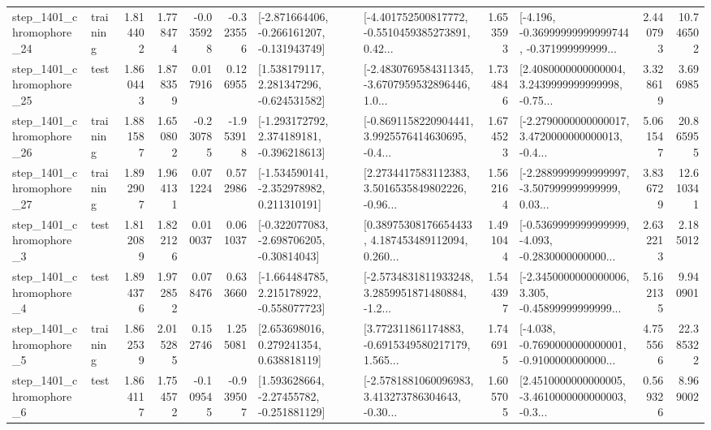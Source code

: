 \begin{tabular}{llrrrrllrlrr}
 step\_1401\_chromophore\_24 &  training &      1.814402 &    1.778474 &     -0.035928 & -0.323556 &  [-2.871664406, -0.266161207, -0.131943749] &  [-4.401752500817772, -0.5510459385273891, 0.42... &       1.653593 &  [-4.196, -0.36999999999999744, -0.371999999999... &            2.440793 &         10.746502 \\
 step\_1401\_chromophore\_25 &      test &      1.860443 &    1.878359 &      0.017916 &  0.126955 &    [1.538179117, 2.281347296, -0.624531582] &  [-2.4830769584311345, -3.6707959532896446, 1.0... &       1.734846 &  [2.4080000000000004, 3.2439999999999998, -0.75... &            3.328619 &          3.696985 \\
 step\_1401\_chromophore\_26 &  training &      1.881587 &    1.650802 &     -0.230785 & -1.953918 &   [-1.293172792, 2.374189181, -0.396218613] &  [-0.8691158220904441, 3.9925576414630695, -0.4... &       1.674523 &  [-2.2790000000000017, 3.4720000000000013, -0.4... &            5.061547 &         20.865955 \\
 step\_1401\_chromophore\_27 &  training &      1.892907 &    1.964131 &      0.071224 &  0.572986 &   [-1.534590141, -2.352978982, 0.211310191] &  [2.2734417583112383, 3.5016535849802226, -0.96... &       1.562164 &  [-2.2889999999999997, -3.507999999999999, 0.03... &            3.836729 &         12.610341 \\
  step\_1401\_chromophore\_3 &      test &      1.812089 &    1.822126 &      0.010037 &  0.061037 &   [-0.322077083, -2.698706205, -0.30814043] &  [0.38975308176654433, 4.187453489112094, 0.260... &       1.491044 &  [-0.5369999999999999, -4.093, -0.2830000000000... &            2.632213 &          2.185012 \\
  step\_1401\_chromophore\_4 &      test &      1.894376 &    1.972852 &      0.078476 &  0.633660 &   [-1.664484785, 2.215178922, -0.558077723] &  [-2.5734831811933248, 3.2859951871480884, -1.2... &       1.544397 &  [-2.3450000000000006, 3.305, -0.45899999999999... &            5.162135 &          9.940901 \\
  step\_1401\_chromophore\_5 &  training &      1.862539 &    2.015285 &      0.152746 &  1.255081 &     [2.653698016, 0.279241354, 0.638818119] &  [3.772311861174883, -0.6915349580217179, 1.565... &       1.746915 &  [-4.038, -0.7690000000000001, -0.9100000000000... &            4.755566 &         22.385322 \\
  step\_1401\_chromophore\_6 &      test &      1.864117 &    1.754572 &     -0.109545 & -0.939507 &    [1.593628664, -2.27455782, -0.251881129] &  [-2.5781881060096983, 3.413273786304643, -0.30... &       1.605705 &  [2.4510000000000005, -3.4610000000000003, -0.3... &            0.569326 &          8.969002 \\

\end{tabular}
